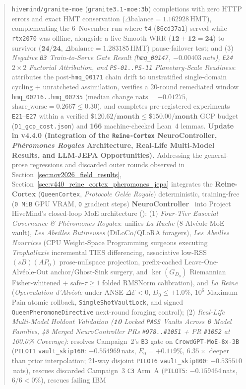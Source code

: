 \documentclass[11pt,a4paper]{article}
\begin{document}
\begin{abstract}
\texttt{hivemind/granite-moe} (\texttt{granite3.1-moe:3b}) completions with zero HTTP errors and exact HMT conservation ($\Delta\text{balance} = \mathbf{1.162928}$\,HMT), complementing the 6~November run where \texttt{t4} (\texttt{86cd37a1}) served while \texttt{rtx2070} was offline, alongside a live Smooth WRR ($\mathbf{12 + 12 = 24}$) to survivor ($\mathbf{24/24}$, $\Delta\text{balance} = \mathbf{1.283185}$\,HMT) pause-failover test; and (3) \emph{Negative \texttt{B3} Train-to-Serve Gate Result (\texttt{hmq\_00147}, $-0.00403$\,nats), \texttt{E24} $2\times 2$ Factorial Attribution, and \texttt{PS-01..PS-11} Planetary-Scale Readiness}: attributes the post-\texttt{hmq\_00171} chain drift to unstratified single-domain cycling + unratcheted assimilation, verifies a 20-round remediated window \texttt{hmq\_00216..hmq\_00235} ($\text{median\_change\_nats} = \mathbf{-0.01275}$, $\text{share\_worse} = \mathbf{0.2667 \le 0.30}$), and completes pre-registered experiments \texttt{E21}--\texttt{E27} within a verified $\mathbf{\$120.62/\text{month} \le \$150.00/\text{month}}$ GCP budget (\texttt{D1\_gcp\_cost.json}) and \textbf{166} machine-checked Lean~4 lemmas. \textbf{Update in v4.4.0 (Integration of the \texttt{Reine-Cortex} NeuroController, \emph{Ph\'eromones Royales} Architecture, Real-Life Multi-Model Results, and LLM-JEPA Opportunities).} Addressing the general-prose regressions and discarded outer rounds observed in Section~\ref{sec:nov2026_field_results}, Section~\ref{sec:v440_reine_cortex_pheromones_jepa} integrates the \textbf{Reine-Cortex} (\texttt{QueenCortex}, \emph{Protocole Gel\'ee Royale}) deterministic, training-free (\texttt{0\,MiB} GPU VRAM, \texttt{0} gradient steps) \textbf{NeuroController}~\cite{callens2026reinecortex} into Project HiveMind's closed-loop MoE architecture (): (1) \emph{Four-Tier Eusocial Governance \& \emph{Ph\'eromones Royales}}: unifies \emph{La Ruche} (8-Alv\'eole MoE vault), \emph{Les Abeilles Butineuses} (DiLoCo/QLoRA foragers), \emph{Les Abeilles Nourrices} (CPU Weight-Space Programming surgeons executing \emph{Trophallaxie} incremental TIES differencing, associative low-RSS $(sB)(AP_0)$ prose-nullspace projection, prefix-cached Leave-One-Alv\'eole-Out anchor/Ghost-Sink surgery, and $\ker(G_{D_0})$ Riemannian Fisher-whitened + safe-$\tau \ge 1$ folded RMSNorm calibration), and \emph{La Reine} (\emph{Operculation d'Alv\'eole} under ANSE $\Delta\mathcal{E} < 0$, $D_0 \le +1.0\%$, $10^6$ Maximum Pain atomic rollback, \texttt{SingleShotVaultLock}, and signed \texttt{QueenPheromoneDirective} next-round foraging control); (2) \emph{Real-Life Multi-Model Holdout Validation (\textbf{10} Locked \texttt{PASS} Vaults Across \textbf{6} Model Families, 48 Merged NeuroController PRs \texttt{\#978..\#1051} + PR \texttt{\#1052} at 100.0\% Coverage)}: resolves Campaign~2's \texttt{B3} gate on \texttt{CrowdGPT-MoE-8x-3B} (\texttt{PILOT1} \texttt{vault\_skip160}: $\mathbf{-0.554969}$\,nats, $E_0 = +0.119\%$, $6.35\times$ deeper than prior interpolation; 21-way disjoint \texttt{PILOT6} \texttt{vault\_skip800}: $\mathbf{-0.535510}$\,nats), rescues discarded Campaign~3 \texttt{C3} Arm~A (\texttt{PILOT5}: $\mathbf{-0.159464}$\,nats, $6/6 < 0\%$), rescues failing IBM 
\end{abstract}
\end{document}

